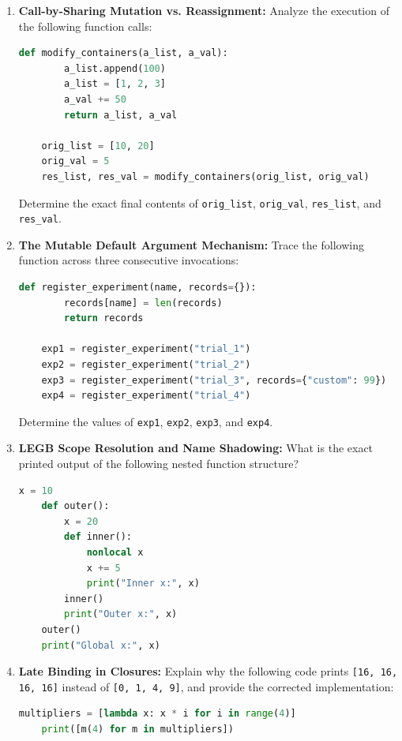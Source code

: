 \begin{enumerate}
    \item \textbf{Call-by-Sharing Mutation vs. Reassignment:}
    Analyze the execution of the following function calls:
    \begin{lstlisting}[language=Python]
    def modify_containers(a_list, a_val):
        a_list.append(100)
        a_list = [1, 2, 3]
        a_val += 50
        return a_list, a_val

    orig_list = [10, 20]
    orig_val = 5
    res_list, res_val = modify_containers(orig_list, orig_val)
    \end{lstlisting}
    Determine the exact final contents of \texttt{orig\_list}, \texttt{orig\_val}, \texttt{res\_list}, and \texttt{res\_val}.

    \item \textbf{The Mutable Default Argument Mechanism:}
    Trace the following function across three consecutive invocations:
    \begin{lstlisting}[language=Python]
    def register_experiment(name, records={}):
        records[name] = len(records)
        return records

    exp1 = register_experiment("trial_1")
    exp2 = register_experiment("trial_2")
    exp3 = register_experiment("trial_3", records={"custom": 99})
    exp4 = register_experiment("trial_4")
    \end{lstlisting}
    Determine the values of \texttt{exp1}, \texttt{exp2}, \texttt{exp3}, and \texttt{exp4}.

    \item \textbf{LEGB Scope Resolution and Name Shadowing:}
    What is the exact printed output of the following nested function structure?
    \begin{lstlisting}[language=Python]
    x = 10
    def outer():
        x = 20
        def inner():
            nonlocal x
            x += 5
            print("Inner x:", x)
        inner()
        print("Outer x:", x)
    outer()
    print("Global x:", x)
    \end{lstlisting}

    \item \textbf{Late Binding in Closures:}
    Explain why the following code prints \texttt{[16, 16, 16, 16]} instead of \texttt{[0, 1, 4, 9]}, and provide the corrected implementation:
    \begin{lstlisting}[language=Python]
    multipliers = [lambda x: x * i for i in range(4)]
    print([m(4) for m in multipliers])
    \end{lstlisting}


\end{enumerate}
